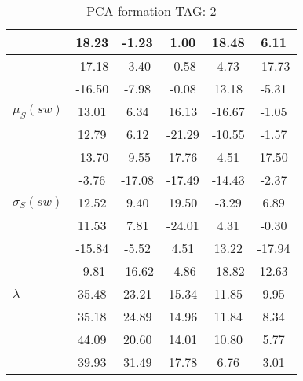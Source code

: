\begin{table}[h!]
\begin{center}
\begin{tabular}{| l | c | c | c | c | c |}
 & 18.23  & -1.23  & 1.00  & 18.48  & 6.11 \\\hline
 & -17.18  & -3.40  & -0.58  & 4.73  & -17.73 \\\hline
 & -16.50  & -7.98  & -0.08  & 13.18  & -5.31 \\\hline
$\mu_S(sw)$ & 13.01  & 6.34  & 16.13  & -16.67  & -1.05 \\\hline
 & 12.79  & 6.12  & -21.29  & -10.55  & -1.57 \\\hline
 & -13.70  & -9.55  & 17.76  & 4.51  & 17.50 \\\hline
 & -3.76  & -17.08  & -17.49  & -14.43  & -2.37 \\\hline
$\sigma_S(sw)$ & 12.52  & 9.40  & 19.50  & -3.29  & 6.89 \\\hline
 & 11.53  & 7.81  & -24.01  & 4.31  & -0.30 \\\hline
 & -15.84  & -5.52  & 4.51  & 13.22  & -17.94 \\\hline
 & -9.81  & -16.62  & -4.86  & -18.82  & 12.63 \\\hline
$\lambda$ & 35.48  & 23.21  & 15.34  & 11.85  & 9.95 \\\hline
 & 35.18  & 24.89  & 14.96  & 11.84  & 8.34 \\\hline
 & 44.09  & 20.60  & 14.01  & 10.80  & 5.77 \\\hline
 & 39.93  & 31.49  & 17.78  & 6.76  & 3.01 \\\hline
\end{tabular}
\caption{PCA formation TAG: 2}
\end{center}
\end{table}